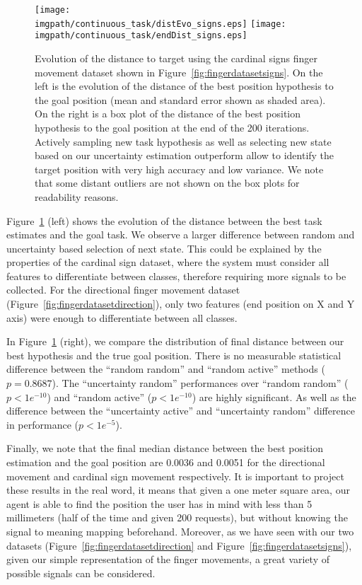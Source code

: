\begin{figure}[!htbp]
\centering
\texttt{[image: \\imgpath/continuous\_task/distEvo\_signs.eps]}
\texttt{[image: \\imgpath/continuous\_task/endDist\_signs.eps]}
\caption{Evolution of the distance to target using the cardinal signs finger movement dataset shown in Figure~\ref{fig:fingerdatasetsigns}. On the left is the evolution of the distance of the best position hypothesis to the goal position (mean and standard error shown as shaded area). On the right is a box plot of the distance of the best position hypothesis to the goal position at the end of the 200 iterations. Actively sampling new task hypothesis as well as selecting new state based on our uncertainty estimation outperform allow to identify the target position with very high accuracy and low variance. We note that some distant outliers are not shown on the box plots for readability reasons.}
\label{fig:continuoustaskdistevolution_signs}
\end{figure}

Figure~\ref{fig:continuoustaskdistevolution_signs} (left) shows the evolution of the distance between the best task estimates and the goal task. We observe a larger difference between random and uncertainty based selection of next state. This could be explained by the properties of the cardinal sign dataset, where the system must consider all features to differentiate between classes, therefore requiring more signals to be collected. For the directional finger movement dataset (Figure~\ref{fig:fingerdatasetdirection}), only two features (end position on X and Y axis) were enough to differentiate between all classes.

In Figure~\ref{fig:continuoustaskdistevolution_signs} (right), we compare the distribution of final distance between our best hypothesis and the true goal position. There is no measurable statistical difference between the ``random random'' and ``random active'' methods ($p = 0.8687$). The ``uncertainty random'' performances over ``random random'' ($p<1e^{-10}$) and ``random active'' ($p<1e^{-10}$) are highly significant. As well as the difference between the ``uncertainty active'' and ``uncertainty random'' difference in performance ($p<1e^{-5}$).

Finally, we note that the final median distance between the best position estimation and the goal position are 0.0036 and 0.0051 for the directional movement and cardinal sign movement respectively. 
It is important to project these results in the real word, it means that given a one meter square area, our agent is able to find the position the user has in mind with less than 5 millimeters (half of the time and given 200 requests), but without knowing the signal to meaning mapping beforehand. Moreover, as we have seen with our two datasets (Figure~\ref{fig:fingerdatasetdirection} and Figure~\ref{fig:fingerdatasetsigns}), given our simple representation of the finger movements, a great variety of possible signals can be considered.

